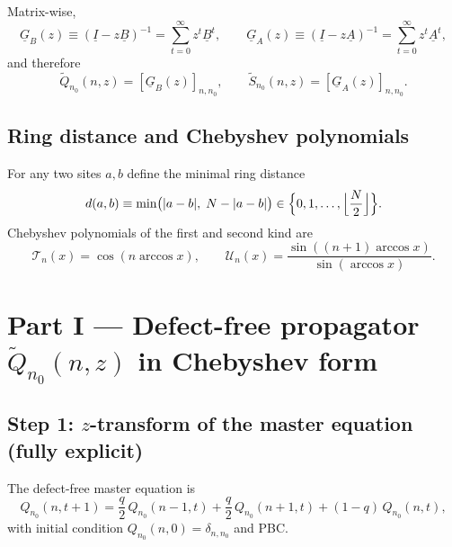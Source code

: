 \documentclass[11pt]{article}
\newcommand{\T}{\mathcal{T}}
\newcommand{\U}{\mathcal{U}}
\begin{document}
Matrix-wise,
\[
\underline{G}_B(z)\equiv (\underline{I}-z\underline{B})^{-1}=\sum_{t=0}^\infty z^t \underline{B}^t,
\qquad
\underline{G}_A(z)\equiv (\underline{I}-z\underline{A})^{-1}=\sum_{t=0}^\infty z^t \underline{A}^t,
\]
and therefore
\[
\tilde Q_{n_0}(n,z)=[\underline{G}_B(z)]_{n,n_0},\qquad
\tilde S_{n_0}(n,z)=[\underline{G}_A(z)]_{n,n_0}.
\]

\subsection{Ring distance and Chebyshev polynomials}
For any two sites $a,b$ define the minimal ring distance
\[
d(a,b)\equiv \min\bigl(|a-b|,\;N-|a-b|\bigr)\in\Bigl\{0,1,\dots,\Bigl\lfloor \frac N2\Bigr\rfloor\Bigr\}.
\]
Chebyshev polynomials of the first and second kind are
\[
\T_n(x)=\cos(n\arccos x),\qquad
\U_n(x)=\frac{\sin((n+1)\arccos x)}{\sin(\arccos x)}.
\]

\section{Part I --- Defect-free propagator $\tilde Q_{n_0}(n,z)$ in Chebyshev form}

\subsection{Step 1: $z$-transform of the master equation (fully explicit)}

The defect-free master equation is
\begin{equation}
Q_{n_0}(n,t+1)=\frac q2\,Q_{n_0}(n-1,t)+\frac q2\,Q_{n_0}(n+1,t)+(1-q)\,Q_{n_0}(n,t),
\label{eq:master_ring}
\end{equation}
with initial condition $Q_{n_0}(n,0)=\delta_{n,n_0}$ and PBC.
\end{document}
